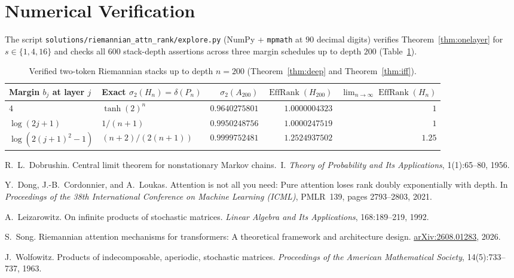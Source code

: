 \documentclass[11pt]{article}
\theoremstyle{plain}
\theoremstyle{definition}
\theoremstyle{remark}
\DeclareMathOperator{\EffRank}{EffRank}
\begin{document}
\section{Numerical Verification}

The script \texttt{solutions/riemannian\_attn\_rank/explore.py} (NumPy + \texttt{mpmath} at $90$ decimal digits) verifies Theorem~\ref{thm:onelayer} for $s \in \{1, 4, 16\}$ and checks all $600$ stack-depth assertions across three margin schedules up to depth $200$ (Table~\ref{tab:stacks}).

\begin{table}[ht]
\centering
\small
\begin{tabular}{@{}llrrr@{}}
\toprule
Margin $b_j$ at layer $j$ & Exact $\sigma_2(H_n) = \delta(P_n)$ & $\sigma_2(A_{200})$ & $\EffRank(H_{200})$ & $\lim_{n\to\infty} \EffRank(H_n)$ \\
\midrule
$4$ & $\tanh(2)^n$ & $0.9640275801$ & $1.0000004323$ & $1$ \\
$\log(2j + 1)$ & $1/(n + 1)$ & $0.9950248756$ & $1.0000247519$ & $1$ \\
$\log(2(j+1)^2 - 1)$ & $(n + 2)/(2(n + 1))$ & $0.9999752481$ & $1.2524937502$ & $1.25$ \\
\bottomrule
\end{tabular}
\caption{Verified two-token Riemannian stacks up to depth $n = 200$ (Theorem~\ref{thm:deep} and Theorem~\ref{thm:iff}).}\label{tab:stacks}
\end{table}

\begin{thebibliography}{9}
R.~L.~Dobrushin.
Central limit theorem for nonstationary Markov chains.~I.
\emph{Theory of Probability and Its Applications}, 1(1):65--80, 1956.

Y.~Dong, J.-B.~Cordonnier, and A.~Loukas.
Attention is not all you need: Pure attention loses rank doubly exponentially with depth.
In \emph{Proceedings of the 38th International Conference on Machine Learning (ICML)}, PMLR~139, pages 2793--2803, 2021.

A.~Leizarowitz.
On infinite products of stochastic matrices.
\emph{Linear Algebra and Its Applications}, 168:189--219, 1992.

S.~Song.
Riemannian attention mechanisms for transformers: A theoretical framework and architecture design.
\href{https://arxiv.org/abs/2608.01283}{arXiv:2608.01283}, 2026.

J.~Wolfowitz.
Products of indecomposable, aperiodic, stochastic matrices.
\emph{Proceedings of the American Mathematical Society}, 14(5):733--737, 1963.
\end{thebibliography}
\end{document}
